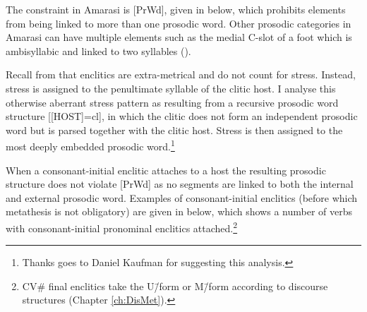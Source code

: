 The constraint in Amarasi is [PrWd], given in  below,
which prohibits elements from being linked to more than one prosodic word.
Other prosodic categories in Amarasi can have multiple elements
such as the medial C-slot of a foot which is ambisyllabic
and linked to two syllables ().

\begin{exe}
	\label{as:CrispEdge[S]}
\end{exe}

Recall from  that enclitics are extra-metrical and do not count for stress.
Instead, stress is assigned to the penultimate syllable of the clitic host.
I analyse this otherwise aberrant stress pattern as resulting
from a recursive prosodic word structure [[HOST]=cl],
in which the clitic does not form an independent prosodic word
but is parsed together with the clitic host.
Stress is then assigned to the most deeply embedded prosodic word.\footnote{
		Thanks goes to Daniel Kaufman for suggesting this analysis.}

When a consonant-initial enclitic attaches to
a host the resulting prosodic structure
does not violate [PrWd] as no segments are linked
to both the internal and external prosodic word.
Examples of consonant-initial enclitics (before which metathesis
is not obligatory) are given in  below,
which shows a number of verbs with consonant-initial pronominal enclitics attached.\footnote{
		CV{\#} final enclitics take the U\=/form or M\=/form
		according to discourse structures (Chapter \ref{ch:DisMet}).}

